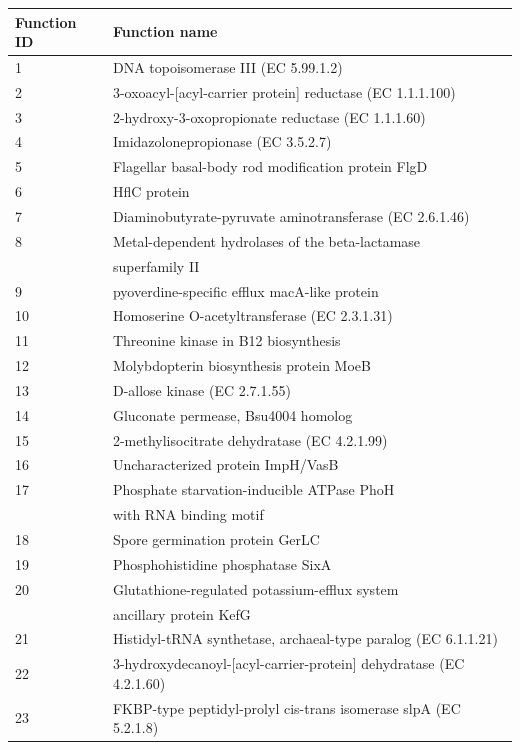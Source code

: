 \begin{table}[!ht]
\begin{tabular}{|l|l|}
\hline
\bf{Function ID} & \bf{Function name}\\ \hline
1 & DNA topoisomerase III (EC 5.99.1.2) \\ \hline
2 & 3-oxoacyl-[acyl-carrier protein] reductase (EC 1.1.1.100) \\ \hline
3 & 2-hydroxy-3-oxopropionate reductase (EC 1.1.1.60) \\ \hline
4 & Imidazolonepropionase (EC 3.5.2.7) \\ \hline
5 & Flagellar basal-body rod modification protein FlgD \\ \hline
6 & HflC protein \\ \hline
7 & Diaminobutyrate-pyruvate aminotransferase (EC 2.6.1.46) \\ \hline
8 & Metal-dependent hydrolases of the beta-lactamase \\
& superfamily II \\ \hline
9 & pyoverdine-specific efflux macA-like protein \\ \hline
10 & Homoserine O-acetyltransferase (EC 2.3.1.31) \\ \hline
11 & Threonine kinase in B12 biosynthesis \\ \hline
12 & Molybdopterin biosynthesis protein MoeB \\ \hline
13 & D-allose kinase (EC 2.7.1.55) \\ \hline
14 & Gluconate permease, Bsu4004 homolog \\ \hline
15 & 2-methylisocitrate dehydratase (EC 4.2.1.99) \\ \hline
16 & Uncharacterized protein ImpH/VasB \\ \hline
17 & Phosphate starvation-inducible ATPase PhoH \\
& with RNA binding motif \\ \hline
18 & Spore germination protein GerLC \\ \hline
19 & Phosphohistidine phosphatase SixA \\ \hline
20 & Glutathione-regulated potassium-efflux system \\
& ancillary protein KefG \\ \hline
21 & Histidyl-tRNA synthetase, archaeal-type paralog (EC 6.1.1.21) \\ \hline
22 & 3-hydroxydecanoyl-[acyl-carrier-protein] dehydratase (EC 4.2.1.60) \\ \hline
23 & FKBP-type peptidyl-prolyl cis-trans isomerase slpA (EC 5.2.1.8) \\ \hline

\end{tabular}
\end{table}
